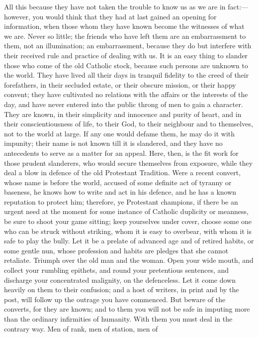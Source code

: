All this because they have not taken the trouble to
know us as we are in fact:—however, you would think
that they had at last gained an opening for information,
when those whom they have known become the witnesses of
what we are. Never so little; the friends who have left
them are an embarrassment to them, not an illumination;
an embarrassment, because they do but interfere with
their received rule and practice of dealing with us. It
is an easy thing to slander those who come of the old
Catholic stock, because such persons are unknown to the
world. They have lived all their days in tranquil
fidelity to the creed of their forefathers, in their
secluded estate, or their obscure mission, or their happy
convent; they have cultivated no relations with the
affairs or the interests of the day, and have never
entered into the public throng of men to gain a
character. They are known, in their simplicity and
innocence and purity of heart, and in their
conscientiousness of life, to their God, to their
neighbour and to themselves, not to the world at large.
If any one would defame them, he may do it with impunity;
their name is not known till it is slandered, and they
have no antecedents to serve as a matter for an appeal.
Here, then, is the fit work for those prudent slanderers,
who would secure themselves from exposure, while they
deal a blow in defence of the old Protestant Tradition.
Were a recent convert, whose name is before the world,
accused of some definite act of tyranny or baseness, he
knows how to write and act in his defence, and he has a
known reputation to protect him; therefore, ye Protestant
champions, if there be an urgent need at the moment for
some instance of Catholic duplicity or meanness, be sure
to shoot your game sitting; keep yourselves under cover,
choose some one who can be struck without striking, whom
it is easy to overbear, with whom it is safe to play the
bully. Let it be a prelate of advanced age and of retired
habits, or some gentle nun, whose profession and habits
are pledges that she cannot retaliate. Triumph over the
old man and the woman. Open your wide mouth, and collect
your rumbling epithets, and round your pretentious
sentences, and discharge your concentrated malignity, on
the defenceless. Let it come down heavily on them to
their confusion; and a host of writers, in print and by
the post, will follow up the outrage you have commenced.
But beware of the converts, for they are known; and to
them you will not be safe in imputing more than the
ordinary infirmities of humanity. With them you must deal
in the contrary way. Men of rank, men of station, men of
